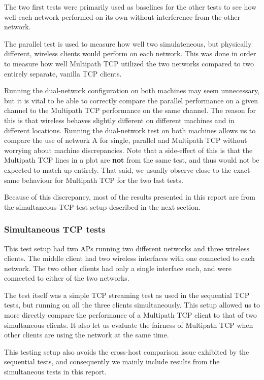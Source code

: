 The two first tests were primarily used as baselines for the other tests to see
how well each network performed on its own without interference from the other
network.

The parallel test is used to measure how well two simulateneous, but physically
different, wireless clients would perform on each network. This was done in
order to measure how well Multipath TCP utilized the two networks compared to
two entirely separate, vanilla TCP clients.

Running the dual-network configuration on both machines may seem unnecessary,
but it is vital to be able to correctly compare the parallel performance on a
given channel to the Multipath TCP performance on the same channel. The reason
for this is that wireless behaves slightly different on different machines and
in different locations. Running the dual-network test on both machines allows us
to compare the use of network A for single, parallel and Multipath TCP without
worrying about machine discrepancies. Note that a side-effect of this is that
the Multipath TCP lines in a plot are \textbf{not} from the same test, and thus
would not be expected to match up entirely. That said, we usually observe close
to the exact same behaviour for Multipath TCP for the two last tests.

Because of this discrepancy, most of the results presented in this report are
from the simultaneous TCP test setup described in the next section.

\subsubsection{Simultaneous TCP tests}
\label{sec:met:setups:simtcp}
This test setup had two APs running two different networks and three wireless
clients. The middle client had two wireless interfaces with one connected to
each network. The two other clients had only a single interface each, and were
connected to either of the two networks.

The test itself was a simple TCP streaming test as used in the sequential TCP
tests, but running on all the three clients simultaneously. This setup allowed
us to more directly compare the performance of a Multipath TCP client to that of
two simultaneous clients. It also let us evaluate the fairness of Multipath TCP
when other clients are using the network at the same time.

This testing setup also avoids the cross-host comparison issue exhibited by the
sequential tests, and consequently we mainly include results from the
simultaneous tests in this report.

